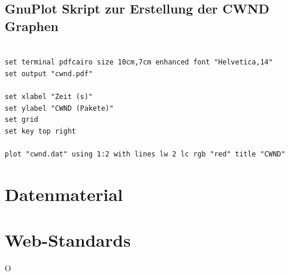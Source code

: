 \documentclass[paper=a4,fontsize=12pt,ngerman]{scrartcl}
\begin{document}
\subsection{GnuPlot Skript zur Erstellung der CWND Graphen}
\label{sec:gnuplot-skript}

\begin{verbatim}

set terminal pdfcairo size 10cm,7cm enhanced font "Helvetica,14"
set output "cwnd.pdf"

set xlabel "Zeit (s)"
set ylabel "CWND (Pakete)"
set grid
set key top right

plot "cwnd.dat" using 1:2 with lines lw 2 lc rgb "red" title "CWND"

\end{verbatim}


\section{Datenmaterial}


\section{Web-Standards}
O
\end{document}
